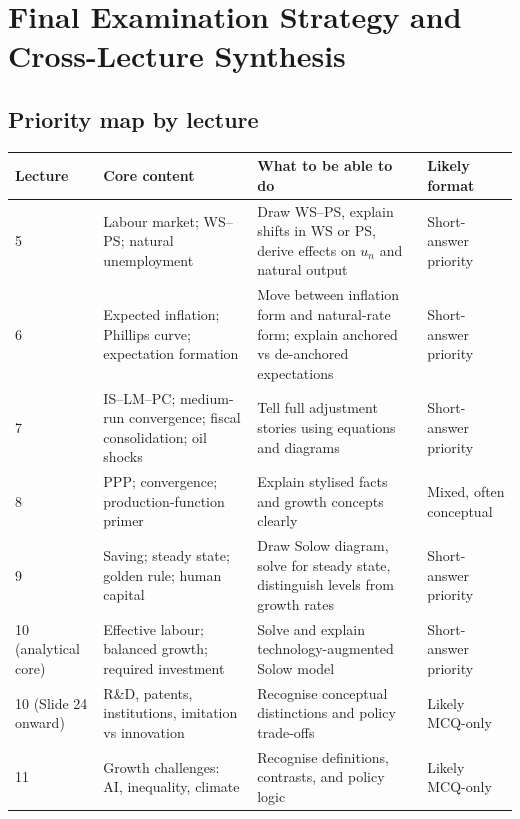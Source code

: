 \documentclass[12pt]{article}
\begin{document}
\newpage
\appendix



\section{Final Examination Strategy and Cross-Lecture Synthesis}

\subsection{Priority map by lecture}

\begin{center}
\renewcommand{\arraystretch}{1.25}
\begin{tabular}{|p{2.0cm}|p{5.7cm}|p{5.0cm}|p{2.6cm}|}
\hline
\textbf{Lecture} & \textbf{Core content} & \textbf{What to be able to do} & \textbf{Likely format} \\
\hline
5 & Labour market; WS--PS; natural unemployment & Draw WS--PS, explain shifts in WS or PS, derive effects on $u_n$ and natural output & Short-answer priority \\
\hline
6 & Expected inflation; Phillips curve; expectation formation & Move between inflation form and natural-rate form; explain anchored vs de-anchored expectations & Short-answer priority \\
\hline
7 & IS--LM--PC; medium-run convergence; fiscal consolidation; oil shocks & Tell full adjustment stories using equations and diagrams & Short-answer priority \\
\hline
8 & PPP; convergence; production-function primer & Explain stylised facts and growth concepts clearly & Mixed, often conceptual \\
\hline
9 & Saving; steady state; golden rule; human capital & Draw Solow diagram, solve for steady state, distinguish levels from growth rates & Short-answer priority \\
\hline
10 (analytical core) & Effective labour; balanced growth; required investment & Solve and explain technology-augmented Solow model & Short-answer priority \\
\hline
10 (Slide 24 onward) & R\&D, patents, institutions, imitation vs innovation & Recognise conceptual distinctions and policy trade-offs & Likely MCQ-only \\
\hline
11 & Growth challenges: AI, inequality, climate & Recognise definitions, contrasts, and policy logic & Likely MCQ-only \\
\hline
\end{tabular}
\end{center}
\end{document}
